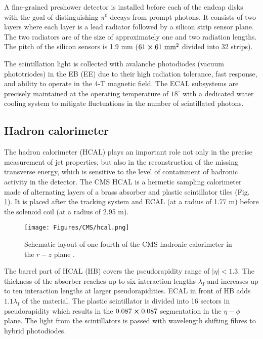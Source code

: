 A fine-grained preshower detector is installed before each of the endcap disks with the goal of distinguishing $\pi^0$ decays from prompt photons. It consists of two layers where each layer is a lead radiator followed by a silicon strip sensor plane. The two radiators are of the size of approximately one and two radiation lengths. The pitch of the silicon sensors is 1.9 mm ($61\cross61 \text{ mm}^2$ divided into 32 strips).  

The scintillation light is collected with avalanche photodiodes (vacuum phototriodes) in the EB (EE) due to their high radiation tolerance, fast response, and ability to operate in the 4-T magnetic field. The ECAL subsystems are precisely maintained at the operating temperature of $18^\circ$ with a dedicated water cooling system to mitigate fluctuations in the number of scintillated photons. 

\subsection{Hadron calorimeter}\label{sec:hcal}
The hadron calorimeter (HCAL) plays an important role not only in the precise measurement of jet properties, but also in the reconstruction of the missing transverse energy, which is sensitive to the level of containment of hadronic activity in the detector. The CMS HCAL is a hermetic sampling calorimeter made of alternating layers of a brass absorber and plastic scintillator tiles (Fig. \ref{fig:hcal}). It is placed after the tracking system and ECAL (at a radius of 1.77 m) before the solenoid coil (at a radius of 2.95 m).

\begin{figure}[h!]
    \centering
    \texttt{[image: Figures/CMS/hcal.png]}
    \caption{Schematic layout of one-fourth of the CMS hadronic calorimeter in the $r-z$ plane \cite{CMS:2008xjf}.}
    \label{fig:hcal}
\end{figure}

The barrel part of HCAL (HB) covers the pseudorapidity range of $|\eta| < 1.3$. The thickness of the absorber reaches up to six interaction lengths $\lambda_I$ and increases up to ten interaction lengths at larger pseudorapidities. ECAL in front of HB adds $1.1 \lambda_I$ of the material. The plastic scintillator is divided into 16 sectors in pseudorapidity which results in the $0.087 \cross 0.087$ segmentation in the $\eta-\phi$ plane. The light from the scintillators is passed with wavelength shifting fibres to hybrid photodiodes.

